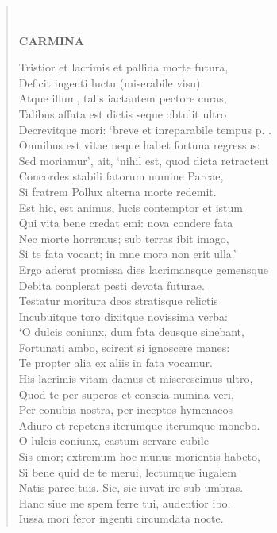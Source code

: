 \documentclass[11pt, a4paper]{report}
\begin{document}
\begin{verse}
        ﻿\pagebreak 
    \begin{center} \textbf{CARMINA} \end{center} \marginpar{[54]} Tristior et lacrimis et pallida morte futura, \\ Deficit ingenti luctu (miserabile visu) \\ Atque illum, talis iactantem pectore curas, \\ Talibus affata est dictis seque obtulit ultro \\ Decrevitque mori: ‘breve et inreparabile tempus p. . \\ Omnibus est vitae neque habet fortuna regressus: \\ Sed moriamur’, ait, ‘nihil est, quod dicta retractent \\ Concordes stabili fatorum numine Parcae, \\ Si fratrem Pollux alterna morte redemit. \\ Est hic, est animus, lucis contemptor et istum \\ Qui vita bene credat emi: nova condere fata \\ Nec morte horremus; sub terras ibit imago, \\ Si te fata vocant; in mne mora non erit ulla.’ \\ Ergo aderat promissa dies lacrimansque gemensque \\ Debita conplerat pesti devota futurae. \\ Testatur moritura deos stratisque relictis \\ Incubuitque toro dixitque novissima verba: \\ ‘O dulcis coniunx, dum fata deusque sinebant, \\ Fortunati ambo, scirent si ignoscere manes: \\ Te propter alia ex aliis in fata vocamur. \\ His lacrimis vitam damus et miserescimus ultro, \\ Quod te per superos et conscia numina veri, \\ Per conubia nostra, per inceptos hymenaeos \\ Adiuro et repetens iterumque iterumque monebo. \\ O lulcis coniunx, castum servare cubile \\ Sis emor; extremum hoc munus morientis habeto, \\ Si bene quid de te merui, lectumque iugalem \\ Natis parce tuis. Sic, sic iuvat ire sub umbras. \\ Hanc siue me spem ferre tui, audentior ibo. \\ Iussa mori feror ingenti circumdata nocte. \\ 

\end{verse}
\end{document}
